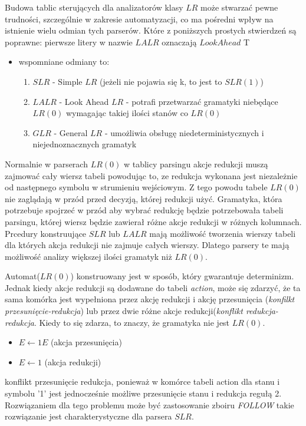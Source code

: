 \answer
{Budowa tablic sterujących dla analizatorów klasy $LR$ może stwarzać pewne trudności, szczególnie w zakresie automatyzacji, co ma pośredni wpływ na istnienie
wielu odmian tych parserów. Które z poniższych prostych stwierdzeń są poprawne:}
{pierwsze litery w nazwie $LALR$ oznaczają $Look Ahead$}
{T}
{\begin{itemize}
\item wspomniane odmiany to:
    \begin{enumerate}
    \item $SLR$ - Simple $LR$ (jeżeli nie pojawia się k, to jest to $SLR(1)$)
    \item $LALR$ - Look Ahead $LR$ - potrafi przetwarzać gramatyki niebędące $LR(0)$ wymagając takiej ilości stanów co $LR(0)$
    \item $GLR$ - General $LR$ - umożliwia obsługę niedeterministycznych i niejednoznacznych gramatyk
    \end{enumerate}
\end{itemize}

Normalnie w parserach $LR(0)$ w tablicy parsingu akcje redukcji muszą zajmować cały wiersz tabeli powodując to, ze redukcja wykonana jest niezależnie od następnego symbolu w strumieniu wejściowym. Z tego powodu tabele $LR(0)$ nie zaglądają w przód przed decyzją, której redukcji użyć. Gramatyka, która potrzebuje spojrzeć w przód aby wybrać redukcję będzie potrzebowała tabeli parsingu, której wiersz będzie zawierał różne akcje redukcji w różnych kolumnach. Prcedury konstruujące $SLR$ lub $LALR$ mają możliwość tworzenia wierszy tabeli dla których akcja redukcji nie zajmuje całych wierszy. Dlatego parsery te mają możliwość analizy większej ilości gramatyk niż $LR(0)$.

Automat($LR(0)$) konstruowany jest w sposób, który gwarantuje determinizm. Jednak kiedy akcje redukcji są dodawane do tabeli \textit{action}, może się zdarzyć, że ta sama komórka jest wypełniona przez akcję redukcji i akcję przesunięcia (\textit{konfilkt przesunięcie-redukcja}) lub przez dwie różne akcje redukcji(\textit{konflikt redukcja-redukcja}. Kiedy to się zdarza, to znaczy, że gramatyka nie jest $LR(0)$.

\begin{itemize}
\item $E \leftarrow 1 E $ (akcja przesunięcia)
\item $ E \leftarrow 1 $ (akcja redukcji)
\end{itemize}
konflikt przesunięcie redukcja, ponieważ w komórce tabeli action dla stanu i symbolu '1' jest jednocześnie możliwe przesunięcie stanu i redukcja regułą 2. Rozwiązaniem dla tego problemu może być zastosowanie zboiru \textit{FOLLOW} takie rozwiązanie jest charakterystyczne dla parsera $SLR$.

}
